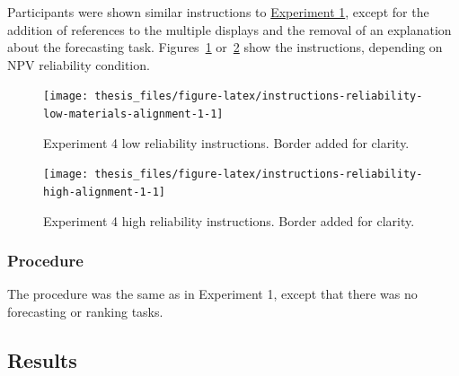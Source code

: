 \documentclass[a4paper, nobind, dvipsnames]{templates/ociamthesis}
\theoremstyle{definition}
\theoremstyle{definition}
\theoremstyle{definition}
\theoremstyle{definition}
\theoremstyle{remark}
\begin{document}
Participants were shown similar instructions to \protect\hyperlink{instructions-materials-alignment-2}{Experiment
1}, except for the addition of references
to the multiple displays and the removal of an explanation about the forecasting
task. Figures~\ref{fig:instructions-reliability-low-materials-alignment-1}
or~\ref{fig:instructions-reliability-high-alignment-1} show the instructions,
depending on NPV reliability condition.



\begin{figure}
\texttt{[image: thesis\_files/figure-latex/instructions-reliability-low-materials-alignment-1-1]} \caption{Experiment 4 low reliability instructions. Border added for clarity.}\label{fig:instructions-reliability-low-materials-alignment-1}
\end{figure}



\begin{figure}
\texttt{[image: thesis\_files/figure-latex/instructions-reliability-high-alignment-1-1]} \caption{Experiment 4 high reliability instructions. Border added for clarity.}\label{fig:instructions-reliability-high-alignment-1}
\end{figure}

\hypertarget{procedure-8}{%
\subsubsection{Procedure}\label{procedure-8}}

The procedure was the same as in Experiment 1, except that there was no
forecasting or ranking tasks.

\hypertarget{results-alignment-1}{%
\subsection{Results}\label{results-alignment-1}}
\end{document}
